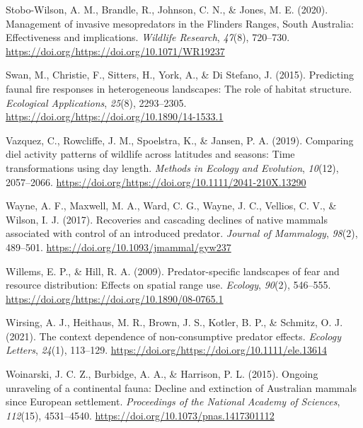 \documentclass[]{elsarticle} %
\begin{document}
\leavevmode\hypertarget{ref-stobo2020management}{}%
Stobo-Wilson, A. M., Brandle, R., Johnson, C. N., \& Jones, M. E. (2020). Management of invasive mesopredators in the Flinders Ranges, South Australia: Effectiveness and implications. \emph{Wildlife Research}, \emph{47}(8), 720--730. \url{https://doi.org/https://doi.org/10.1071/WR19237}

\leavevmode\hypertarget{ref-swan2015predicting}{}%
Swan, M., Christie, F., Sitters, H., York, A., \& Di Stefano, J. (2015). Predicting faunal fire responses in heterogeneous landscapes: The role of habitat structure. \emph{Ecological Applications}, \emph{25}(8), 2293--2305. \url{https://doi.org/https://doi.org/10.1890/14-1533.1}

\leavevmode\hypertarget{ref-vazquez2019comparing}{}%
Vazquez, C., Rowcliffe, J. M., Spoelstra, K., \& Jansen, P. A. (2019). Comparing diel activity patterns of wildlife across latitudes and seasons: Time transformations using day length. \emph{Methods in Ecology and Evolution}, \emph{10}(12), 2057--2066. \url{https://doi.org/https://doi.org/10.1111/2041-210X.13290}

\leavevmode\hypertarget{ref-wayne2017recoveries}{}%
Wayne, A. F., Maxwell, M. A., Ward, C. G., Wayne, J. C., Vellios, C. V., \& Wilson, I. J. (2017). Recoveries and cascading declines of native mammals associated with control of an introduced predator. \emph{Journal of Mammalogy}, \emph{98}(2), 489--501. \url{https://doi.org/10.1093/jmammal/gyw237}

\leavevmode\hypertarget{ref-willems2009predator}{}%
Willems, E. P., \& Hill, R. A. (2009). Predator-specific landscapes of fear and resource distribution: Effects on spatial range use. \emph{Ecology}, \emph{90}(2), 546--555. \url{https://doi.org/https://doi.org/10.1890/08-0765.1}

\leavevmode\hypertarget{ref-wirsing2021context}{}%
Wirsing, A. J., Heithaus, M. R., Brown, J. S., Kotler, B. P., \& Schmitz, O. J. (2021). The context dependence of non-consumptive predator effects. \emph{Ecology Letters}, \emph{24}(1), 113--129. \url{https://doi.org/https://doi.org/10.1111/ele.13614}

\leavevmode\hypertarget{ref-woinarski2015ongoing}{}%
Woinarski, J. C. Z., Burbidge, A. A., \& Harrison, P. L. (2015). Ongoing unraveling of a continental fauna: Decline and extinction of Australian mammals since European settlement. \emph{Proceedings of the National Academy of Sciences}, \emph{112}(15), 4531--4540. \url{https://doi.org/10.1073/pnas.1417301112}
\end{document}
